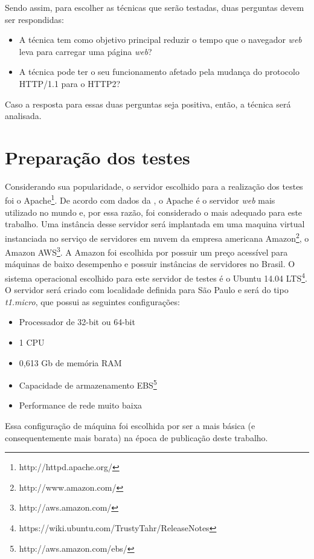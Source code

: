 Sendo assim, para escolher as técnicas que serão testadas, duas perguntas devem ser respondidas:

\begin{itemize}
	\item A técnica tem como objetivo principal reduzir o tempo que o navegador \textit{web} leva para carregar uma página \textit{web}?
	\item A técnica pode ter o seu funcionamento afetado pela mudança do protocolo HTTP/1.1 para o HTTP2?
\end{itemize}

Caso a resposta para essas duas perguntas seja positiva, então, a técnica será analisada.

\section{Preparação dos testes}

Considerando sua popularidade, o servidor escolhido para a realização dos testes foi o Apache\footnote{http://httpd.apache.org/}. De acordo com dados da , o Apache é o servidor \textit{web} mais utilizado no mundo e, por essa razão, foi considerado o mais adequado para este trabalho. Uma instância desse servidor será implantada em uma maquina virtual instanciada no serviço de servidores em nuvem da empresa americana Amazon\footnote{http://www.amazon.com/}, o Amazon AWS\footnote{http://aws.amazon.com/}. A Amazon foi escolhida por possuir um preço acessível para máquinas de baixo desempenho e possuir instâncias de servidores no Brasil. O sistema operacional escolhido para este servidor de testes é o Ubuntu 14.04 LTS\footnote{https://wiki.ubuntu.com/TrustyTahr/ReleaseNotes}. O servidor será criado com localidade definida para São Paulo e será do tipo \textit{t1.micro}, que possui as seguintes configurações:

\begin{itemize}
	\item Processador de 32-bit ou 64-bit
	\item 1 CPU
	\item 0,613 Gb de memória RAM
	\item Capacidade de armazenamento EBS\footnote{http://aws.amazon.com/ebs/}
	\item Performance de rede muito baixa
\end{itemize}

Essa configuração de máquina foi escolhida por ser a mais básica (e consequentemente mais barata) na época de publicação deste trabalho.

